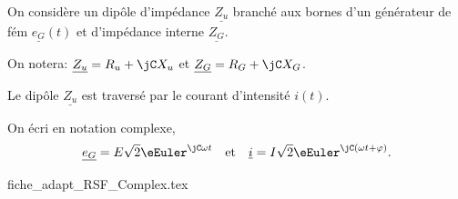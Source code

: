 
\hauteurLargeurCadreReponse		{8mm}{3cm}
\initialisationEntrainement

                                \initialisationPartieGauche %

On considère un dipôle d'impédance $\underline{Z_u}$ branché aux bornes d'un générateur de fém $\underline{e_G}(t)$ et d'impédance interne $\underline{Z_G}$. 

On notera: $\underline{Z_u} = R_u +\jC X_u$ et $\underline{Z_G} = R_G +\jC X_G$.

Le dipôle $\underline{Z_u}$ est traversé par le courant d'intensité $i(t)$.

On écri en notation complexe, 
\[
\underline{e_G}  = E\sqrt{2} \eEuler^{\jC \omega t}
\quad\text{et}\quad
\underline{i}  = I\sqrt{2} \eEuler^{\jC (\omega t + \varphi)}.
\]

                                \initialisationPartieDroite %
\begin{center}
{fiche_adapt_RSF_Complex.tex}
\end{center}
                               \finalisationDuPartageDePage %




